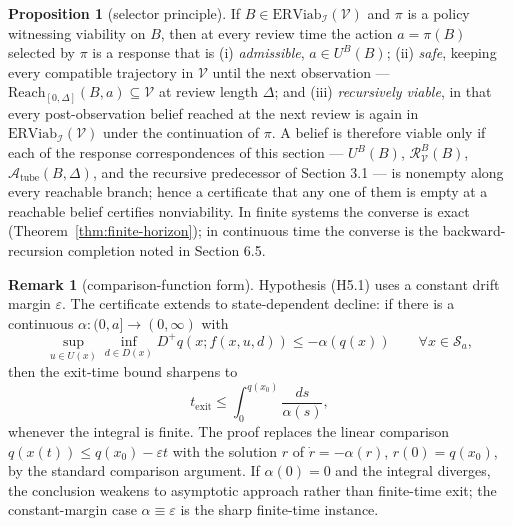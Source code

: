 \documentclass[11pt]{article}
\theoremstyle{definition}
\newtheorem{proposition}{Proposition}
\newtheorem{remark}{Remark}
\begin{document}
\begin{proposition}[selector principle]\label{prop:selector}
If \(B\in\mathrm{ERViab}_{\mathcal{I}}(\mathcal{V})\) and \(\pi\) is a
policy witnessing viability on \(B\), then at every review time the
action \(a=\pi(B)\) selected by \(\pi\) is a response that is
(i) \emph{admissible}, \(a\in U^B(B)\); (ii) \emph{safe}, keeping every
compatible trajectory in \(\mathcal{V}\) until the next observation ---
\(\mathrm{Reach}_{[0,\Delta]}(B,a)\subseteq\mathcal{V}\) at review
length \(\Delta\); and (iii) \emph{recursively viable}, in that every
post-observation belief reached at the next review is again in
\(\mathrm{ERViab}_{\mathcal{I}}(\mathcal{V})\) under the continuation
of \(\pi\). A belief is therefore viable only if each of the response
correspondences of this section --- \(U^B(B)\),
\(\mathcal{R}_{\mathcal{V}}^B(B)\), \(\mathcal{A}_{\mathrm{tube}}(B,\Delta)\),
and the recursive predecessor of Section 3.1 --- is nonempty along
every reachable branch; hence a certificate that any one of them is
empty at a reachable belief certifies nonviability. In finite systems
the converse is exact (Theorem~\ref{thm:finite-horizon}); in continuous
time the converse is the backward-recursion completion noted in
Section 6.5.
\end{proposition}

\begin{remark}[comparison-function form]\label{rem:comparison}
Hypothesis (H5.1) uses a constant drift margin \(\varepsilon\). The
certificate extends to state-dependent decline: if there is a continuous
\(\alpha:(0,a]\to(0,\infty)\) with
\[\sup_{u\in U(x)}\inf_{d\in D(x)} D^+q(x; f(x,u,d)) \le -\alpha(q(x)) \qquad \forall x\in\mathcal{S}_a,\]
then the exit-time bound sharpens to
\[t_{\mathrm{exit}} \le \int_0^{q(x_0)} \frac{ds}{\alpha(s)},\]
whenever the integral is finite. The proof replaces the linear comparison
\(q(x(t))\le q(x_0)-\varepsilon t\) with the solution \(r\) of
\(\dot r=-\alpha(r)\), \(r(0)=q(x_0)\), by the standard comparison
argument. If \(\alpha(0)=0\) and the integral diverges, the conclusion
weakens to asymptotic approach rather than finite-time exit; the
constant-margin case \(\alpha\equiv\varepsilon\) is the sharp finite-time
instance.
\end{remark}
\end{document}
